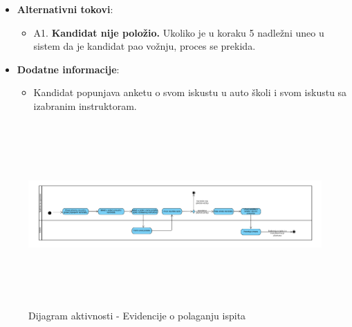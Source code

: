 \begin{itemize}
  \item \textbf{Alternativni tokovi}:
      \begin{itemize}
        \item A1. \textbf{Kandidat nije položio.}
        Ukoliko je u koraku 5 nadležni uneo u sistem da je kandidat pao vožnju, proces se prekida.
      \end{itemize}
      
  \item \textbf{Dodatne informacije}:
      \begin{itemize}
        \item Kandidat popunjava anketu o svom iskustu u auto školi i svom iskustu sa izabranim instruktoram.
      \end{itemize}
\end{itemize}

\begin{figure}[H]
  \begin{center}
      \includegraphics[width=140mm, height=70mm]{Diagrams/dijagram_aktivnosti_vodjenje evidencije.png}
  \end{center}
  \caption {Dijagram aktivnosti - Evidencije o polaganju ispita}
  \label{activity_evidencije_o_polaganju_ispita}

\end{figure}
